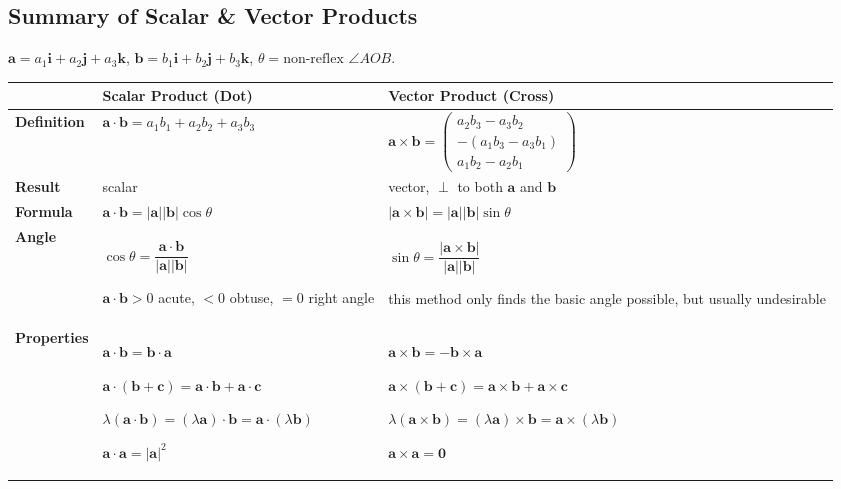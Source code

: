 \documentclass[a4paper]{book}
\newcommand{\cvv}[3]{\begin{pmatrix}#1\\#2\\#3\end{pmatrix}}
\begin{document}
\clearpage
\subsection{Summary of Scalar \& Vector Products}
\noindent$\mathbf a=a_1\mathbf i+a_2\mathbf j+a_3\mathbf k$,\quad
$\mathbf b=b_1\mathbf i+b_2\mathbf j+b_3\mathbf k$,\quad
$\theta=\text{non-reflex }\angle AOB$.
\par\smallskip
{\renewcommand{\arraystretch}{1.12}\setlength{\tabcolsep}{3.5pt}\footnotesize
\noindent\begin{tabular}{|>{\raggedright\arraybackslash}p{2.15cm}|p{6.5cm}|p{6.5cm}|}
\hline
& \centering\textbf{Scalar Product (Dot)} & \centering\arraybackslash\textbf{Vector Product (Cross)}\\\hline
\textbf{Definition} &
$\mathbf a\cdot\mathbf b=a_1b_1+a_2b_2+a_3b_3$ &
$\mathbf a\times\mathbf b=\cvv{a_2b_3-a_3b_2}{-(a_1b_3-a_3b_1)}{a_1b_2-a_2b_1}$\\\hline
\textbf{Result} &
scalar &
vector, $\perp$ to both $\mathbf a$ and $\mathbf b$\\\hline
\textbf{Formula} &
$\mathbf a\cdot\mathbf b=|\mathbf a||\mathbf b|\cos\theta$ &
$|\mathbf a\times\mathbf b|=|\mathbf a||\mathbf b|\sin\theta$\\\hline
\textbf{Angle} &
$\cos\theta=\dfrac{\mathbf a\cdot\mathbf b}{|\mathbf a||\mathbf b|}$\par
$\mathbf a\cdot\mathbf b>0$ acute, $<0$ obtuse, $=0$ right angle &
$\sin\theta=\dfrac{|\mathbf a\times\mathbf b|}{|\mathbf a||\mathbf b|}$\par
{\scriptsize\color{black!55}this method only finds the basic angle possible, but usually undesirable}\\\hline
\textbf{Properties} &
$\mathbf a\cdot\mathbf b=\mathbf b\cdot\mathbf a$\par
$\mathbf a\cdot(\mathbf b+\mathbf c)=\mathbf a\cdot\mathbf b+\mathbf a\cdot\mathbf c$\par
$\lambda(\mathbf a\cdot\mathbf b)=(\lambda\mathbf a)\cdot\mathbf b=\mathbf a\cdot(\lambda\mathbf b)$\par
$\mathbf a\cdot\mathbf a=|\mathbf a|^2$ &
$\mathbf a\times\mathbf b=-\mathbf b\times\mathbf a$\par
$\mathbf a\times(\mathbf b+\mathbf c)=\mathbf a\times\mathbf b+\mathbf a\times\mathbf c$\par
$\lambda(\mathbf a\times\mathbf b)=(\lambda\mathbf a)\times\mathbf b=\mathbf a\times(\lambda\mathbf b)$\par
$\mathbf a\times\mathbf a=\mathbf 0$\\\hline

\end{tabular}}
\end{document}
